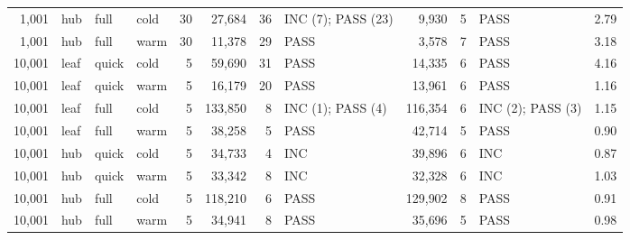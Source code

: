\begin{table}[h!]
\begin{tabular}{rlllrrrlrrlr}
1{,}001 & hub & full & cold & 30 & 27{,}684 & 36 & INC (7); PASS (23) & 9{,}930 & 5 & PASS & 2.79 \\
1{,}001 & hub & full & warm & 30 & 11{,}378 & 29 & PASS & 3{,}578 & 7 & PASS & 3.18 \\
10{,}001 & leaf & quick & cold & 5 & 59{,}690 & 31 & PASS & 14{,}335 & 6 & PASS & 4.16 \\
10{,}001 & leaf & quick & warm & 5 & 16{,}179 & 20 & PASS & 13{,}961 & 6 & PASS & 1.16 \\
10{,}001 & leaf & full & cold & 5 & 133{,}850 & 8 & INC (1); PASS (4) & 116{,}354 & 6 & INC (2); PASS (3) & 1.15 \\
10{,}001 & leaf & full & warm & 5 & 38{,}258 & 5 & PASS & 42{,}714 & 5 & PASS & 0.90 \\
10{,}001 & hub & quick & cold & 5 & 34{,}733 & 4 & INC & 39{,}896 & 6 & INC & 0.87 \\
10{,}001 & hub & quick & warm & 5 & 33{,}342 & 8 & INC & 32{,}328 & 6 & INC & 1.03 \\
10{,}001 & hub & full & cold & 5 & 118{,}210 & 6 & PASS & 129{,}902 & 8 & PASS & 0.91 \\
10{,}001 & hub & full & warm & 5 & 34{,}941 & 8 & PASS & 35{,}696 & 5 & PASS & 0.98 \\
\bottomrule
\end{tabular}
\end{table}
